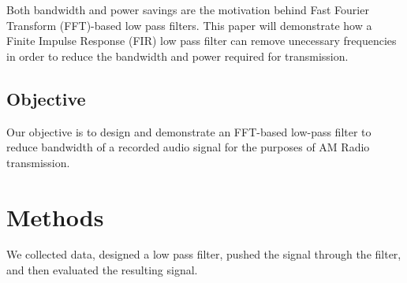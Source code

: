 Both bandwidth and power savings are the motivation behind Fast Fourier Transform (FFT)-based low pass filters.  This paper will demonstrate how a Finite Impulse Response (FIR) low pass filter can remove unecessary frequencies in order to reduce the bandwidth and power required for transmission.  

\subsection{Objective}
Our objective is to design and demonstrate an FFT-based low-pass filter to reduce bandwidth of a recorded audio signal for the purposes of AM Radio transmission.

\section{Methods}
We collected data, designed a low pass filter, pushed the signal through the filter, and then evaluated the resulting signal.










